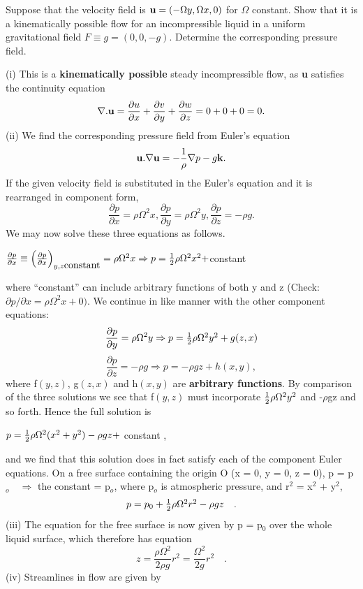 \documentclass[10pt]{report}
\begin{document}
\begin{examplebox}
Suppose that the velocity field is ${{\bf u}}=(-\Omega
y,\Omega x,0)$ for $\Omega $ constant. Show that it is a
kinematically possible flow for an incompressible liquid in a uniform
gravitational field $F\equiv g=(0,0,-g)$. Determine the corresponding
pressure field.

\begin{examplesolution2}
	(i) This is a \textbf{kinematically possible} steady incompressible flow, as
	\textbf{u} satisfies the continuity equation
	\[
	\nabla . {{\bf u}}=\frac{\partial u}{\partial
	x}+\frac{\partial v}{\partial y}+\frac{\partial w}{\partial
	z}=0+0+0=0.
	\]
	(ii) We find the corresponding pressure field from Euler's equation
	\[
	{{\bf u}}. \nabla {{\bf u}}=-\frac{1}{\rho }\nabla
	p-g{{\bf k}}.
	\]
	If the given velocity field is substituted in the Euler's equation and it is
	rearranged in component form,
	\[
	\frac{\partial p}{\partial x}=\rho \Omega ^2x,\frac{\partial
	p}{\partial y}=\rho \Omega ^2y,\frac{\partial p}{\partial
	z}=-\rho g.
	\]
	We may now solve these three equations as follows.

	$\frac{\partial p}{\partial x}\equiv \left( {\frac{\partial
	p}{\partial x}} \right)_{y,z\mbox{constant}} =\rho \Omega
	^2x\Rightarrow p=\textstyle{1 \over 2}\rho \Omega
	^2x^2+$constant

	where ``constant'' can include arbitrary functions of both y and z (Check:
	$\partial p/\partial x=\rho \Omega ^2x+0)$. We continue in
	like manner with the other component equations:
	\[
	\frac{\partial p}{\partial y}=\rho \Omega
	^2y\Rightarrow
	p=\textstyle{1 \over 2}\rho \Omega
	^2y^2+g(z,x)
	\]
	\[
	\frac{\partial p}{\partial z}=-\rho g
	\Rightarrow p=-\rho gz+h(x,y),
	\]
	where f$(y,z)$, g$(z,x)$ and h$(x,y)$ are \textbf{arbitrary functions}. By
	comparison of the three solutions we see that f$(y,z)$ must incorporate
	$\textstyle{1 \over 2}\rho \Omega ^2y^2$ and -$\rho $gz and so forth.
	Hence the full solution is

	$p=\textstyle{1 \over 2}\rho \Omega
	^2(x^2+y^2)-\rho gz+$ constant ,

	and we find that this solution does in fact satisfy each of the component
	Euler equations. On a free surface containing the origin O (x = 0, y = 0, z
	= 0), p = p$_{o} \quad \Rightarrow $ the constant = p$_{o}$, where p$_{o}$ is
	atmospheric pressure, and r$^{2}$ = x$^{2}$ + y$^{2}$,
	\[
	p=p_0 +\textstyle{1 \over 2}\rho \Omega ^2r^2-\rho
	gz\quad .
	\]
	(iii) The equation for the free surface is now given by p = p$_{0}$ over the
	whole liquid surface, which therefore has equation
	\[
	z=\frac{\rho \Omega ^2}{2\rho g}r^2=\frac{\Omega
	^2}{2g}r^2\quad .
	\]
	(iv) Streamlines in flow are given by


\end{examplesolution2}
\end{examplebox}
\end{document}
